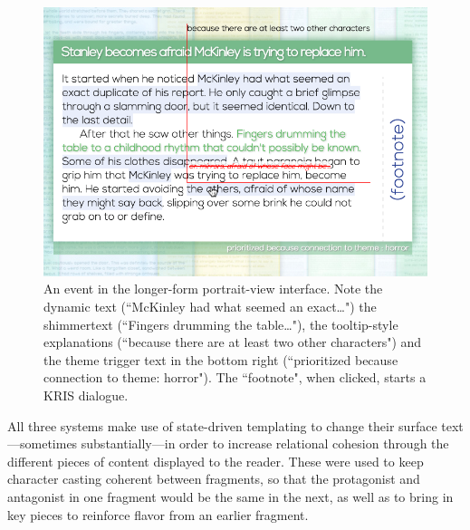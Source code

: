 
\begin{figure}
    \centering
    \includegraphics[width=\textwidth]{figures/2-Ice-Bound/event.png}
    \caption{An event in the longer-form portrait-view interface. Note the dynamic text (``McKinley had what seemed an exact…") the shimmertext (``Fingers drumming the table…"), the tooltip-style explanations (``because there are at least two other characters") and the theme trigger text in the bottom right (``prioritized because connection to theme: horror"). The ``footnote", when clicked, starts a KRIS dialogue.}
    \label{fig:event}
\end{figure}



All three systems make use of state-driven templating to change their surface text---sometimes substantially---in order to increase relational cohesion through the different pieces of content displayed to the reader. These were used to keep character casting coherent between fragments, so that the protagonist and antagonist in one fragment would be the same in the next, as well as to bring in key pieces to reinforce flavor from an earlier fragment.

